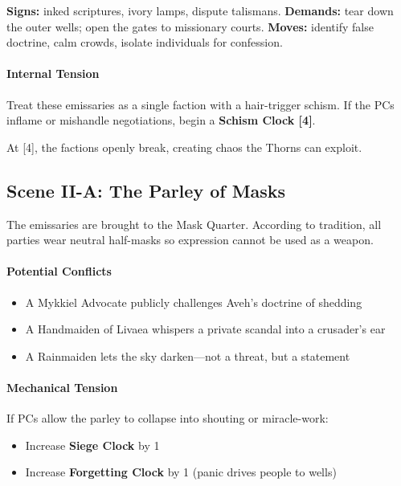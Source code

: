 \documentclass[11pt]{book}
\begin{document}
\textbf{Signs:} inked scriptures, ivory lamps, dispute talismans.  
\textbf{Demands:} tear down the outer wells; open the gates to missionary courts.  
\textbf{Moves:} identify false doctrine, calm crowds, isolate individuals for confession.

\paragraph{Internal Tension}
Treat these emissaries as a single faction with a hair-trigger schism.
If the PCs inflame or mishandle negotiations, begin a \textbf{Schism Clock [4]}.

At [4], the factions openly break, creating chaos the Thorns can exploit.

\subsection*{Scene II-A: The Parley of Masks}

The emissaries are brought to the Mask Quarter.  
According to tradition, all parties wear neutral half-masks so expression
cannot be used as a weapon.

\paragraph{Potential Conflicts}
\begin{itemize}[leftmargin=*]
    \item A Mykkiel Advocate publicly challenges Aveh's doctrine of shedding
    \item A Handmaiden of Livaea whispers a private scandal into a crusader's ear
    \item A Rainmaiden lets the sky darken---not a threat, but a statement
\end{itemize}

\paragraph{Mechanical Tension}
If PCs allow the parley to collapse into shouting or miracle-work:
\begin{itemize}
    \item Increase \textbf{Siege Clock} by 1
    \item Increase \textbf{Forgetting Clock} by 1 (panic drives people to wells)
\end{itemize}
\end{document}
